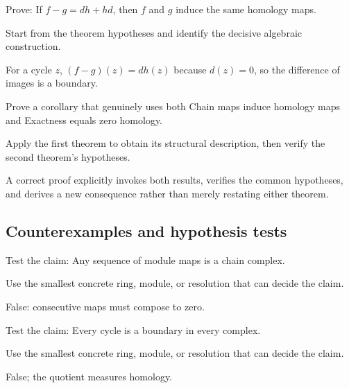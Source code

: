 \begin{exercise}\label{exr:v22-expand-08}
Prove: If $f-g=dh+hd$, then $f$ and $g$ induce the same homology maps.
\end{exercise}
\begin{hint}
Start from the theorem hypotheses and identify the decisive algebraic construction.
\end{hint}
\begin{solution}
For a cycle $z$, $(f-g)(z)=d h(z)$ because $d(z)=0$, so the difference of images is a boundary.
\end{solution}

\begin{exercise}\label{exr:v22-expand-09}
Prove a corollary that genuinely uses both Chain maps induce homology maps and Exactness equals zero homology.
\end{exercise}
\begin{hint}
Apply the first theorem to obtain its structural description, then verify the second theorem's hypotheses.
\end{hint}
\begin{solution}
A correct proof explicitly invokes both results, verifies the common hypotheses, and derives a new consequence rather than merely restating either theorem.
\end{solution}

\subsection*{Counterexamples and hypothesis tests}

\begin{exercise}\label{exr:v22-expand-10}
Test the claim: Any sequence of module maps is a chain complex.
\end{exercise}
\begin{hint}
Use the smallest concrete ring, module, or resolution that can decide the claim.
\end{hint}
\begin{solution}
False: consecutive maps must compose to zero.
\end{solution}

\begin{exercise}\label{exr:v22-expand-11}
Test the claim: Every cycle is a boundary in every complex.
\end{exercise}
\begin{hint}
Use the smallest concrete ring, module, or resolution that can decide the claim.
\end{hint}
\begin{solution}
False; the quotient measures homology.
\end{solution}

